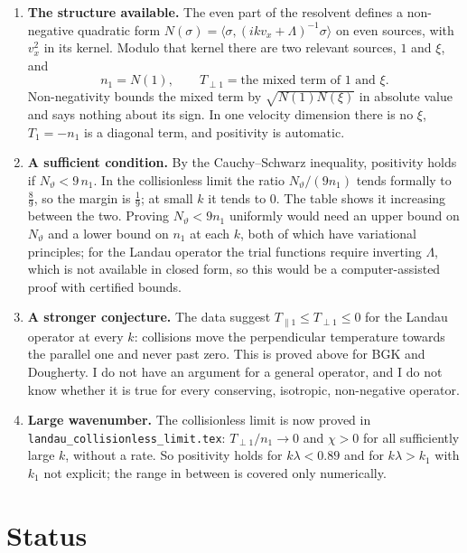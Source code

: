\documentclass[11pt]{article}
\newcommand{\avg}[1]{\langle #1\rangle}
\newcommand{\Tpar}{T_{\parallel1}}
\newcommand{\Tperp}{T_{\perp1}}
\theoremstyle{remark}
\begin{document}
\begin{enumerate}
  \item \textbf{The structure available.} The even part of the resolvent
    defines a non-negative quadratic form
    $N(\sigma)=\avg{\sigma,(ikv_x+\Lambda)^{-1}\sigma}$ on even sources, with
    $v_x^2$ in its kernel. Modulo that kernel there are two relevant sources,
    $1$ and $\xi$, and
    \[
      n_1=N(1),\qquad \Tperp=\text{the mixed term of }1\text{ and }\xi .
    \]
    Non-negativity bounds the mixed term by $\sqrt{N(1)N(\xi)}$ in absolute
    value and says nothing about its sign. In one velocity dimension there is
    no $\xi$, $T_1=-n_1$ is a diagonal term, and positivity is automatic.
  \item \textbf{A sufficient condition.} By the Cauchy--Schwarz inequality,
    positivity holds if $N_\vartheta<9\,n_1$. In the collisionless limit the
    ratio $N_\vartheta/(9n_1)$ tends formally to $\tfrac89$, so the margin
    is $\tfrac19$; at small $k$ it tends to $0$. The table shows it
    increasing between the two. Proving $N_\vartheta<9n_1$ uniformly would
    need an upper bound on $N_\vartheta$ and a lower bound on $n_1$ at each
    $k$, both of which have variational principles; for the Landau operator
    the trial functions require inverting $\Lambda$, which is not available
    in closed form, so this would be a computer-assisted proof with
    certified bounds.
  \item \textbf{A stronger conjecture.} The data suggest
    $\Tpar\le\Tperp\le0$ for the Landau operator at every $k$: collisions
    move the perpendicular temperature towards the parallel one and never
    past zero. This is proved above for BGK and Dougherty. I do not have an
    argument for a general operator, and I do not know whether it is true
    for every conserving, isotropic, non-negative operator.
  \item \textbf{Large wavenumber.} The collisionless limit is now proved
    in \texttt{landau\_collisionless\_limit.tex}:
    $T_{\perp1}/n_1\to0$ and $\chi>0$ for all sufficiently large $k$, without
    a rate. So positivity holds for $k\lambda<0.89$ and for $k\lambda>k_1$
    with $k_1$ not explicit; the range in between is covered only
    numerically.
\end{enumerate}

\section{Status}
\end{document}
